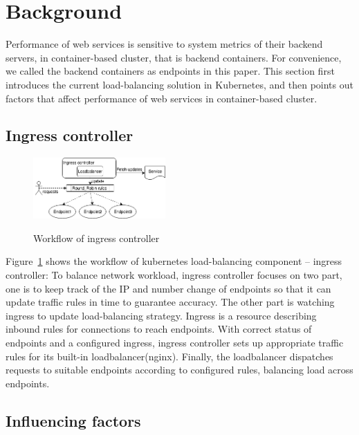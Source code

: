 \section{Background}
\label{sec:background}

Performance of web services is sensitive to system metrics of their backend servers, in container-based cluster, that is backend containers. For convenience, we called the backend containers as endpoints in this paper. This section first introduces the current load-balancing solution in Kubernetes, and then points out factors that affect performance of web services in container-based cluster.

\subsection{Ingress controller}
\label{subsec:ingress_controller}

\begin{figure}[htbp]
  \centering
  \includegraphics[width=0.45\textwidth]{images/ingress_controller.png}\\
  \caption{Workflow of ingress controller}
  \label{fig:ingress_controller}
\end{figure}
\hspace{0pt}

Figure~{\ref{fig:ingress_controller}} shows the workflow of kubernetes load-balancing component -- ingress controller: To balance network workload, ingress controller focuses on two part, one is to keep track of the IP and number change of endpoints so that it can update traffic rules in time to guarantee accuracy. The other part is watching ingress to update load-balancing strategy. Ingress is a resource describing inbound rules for connections to reach endpoints. With correct status of endpoints and a configured ingress, ingress controller sets up appropriate traffic rules for its built-in loadbalancer(nginx). Finally, the loadbalancer dispatches requests to suitable endpoints according to configured rules, balancing load across endpoints.

\subsection{Influencing factors}
\label{subsec:Influencing_factors}

